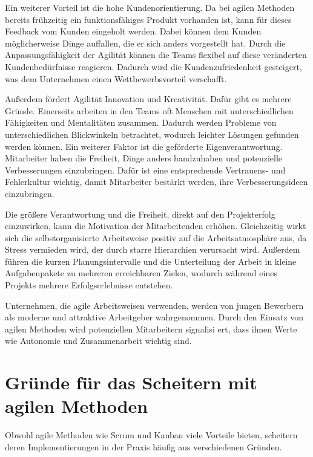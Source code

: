 \documentclass[ngerman]{seminarvorlage}
\begin{document}
Ein weiterer Vorteil ist die hohe Kundenorientierung. Da bei agilen Methoden bereits frühzeitig ein funktionsfähiges Produkt vorhanden ist, kann für dieses Feedback vom Kunden eingeholt werden. Dabei können dem Kunden möglicherweise Dinge auffallen, die er sich anders vorgestellt hat. Durch die Anpassungsfähigkeit der Agilität können die Teams flexibel auf diese veränderten Kundenbedürfnisse reagieren. Dadurch wird die Kundenzufriedenheit gesteigert, was dem Unternehmen einen Wettbewerbsvorteil verschafft.\cite{Theobald.2021,facebook.2024}

Außerdem fördert Agilität Innovation und Kreativität. Dafür gibt es mehrere Gründe. Einerseits arbeiten in den Teams oft Menschen mit unterschiedlichen Fähigkeiten und Mentalitäten zusammen. Dadurch werden Probleme von unterschiedlichen Blickwinkeln betrachtet, wodurch leichter Lösungen gefunden werden können.  Ein weiterer Faktor ist die geförderte Eigenverantwortung. Mitarbeiter haben die Freiheit, Dinge anders handzuhaben und potenzielle Verbesserungen einzubringen. Dafür ist eine entsprechende Vertrauens- und Fehlerkultur wichtig, damit Mitarbeiter bestärkt werden, ihre Verbesserungsideen einzubringen. \cite{Theobald.2021}

Die größere Verantwortung und die Freiheit, direkt auf den Projekterfolg einzuwirken, kann die Motivation der Mitarbeitenden erhöhen. Gleichzeitig wirkt sich die selbstorganisierte Arbeitsweise positiv auf die Arbeitsatmosphäre aus, da Stress vermieden wird, der durch starre Hierarchien verursacht wird. Außerdem führen die kurzen Planungsintervalle und die Unterteilung der Arbeit in kleine Aufgabenpakete zu mehreren erreichbaren Zielen, wodurch während eines Projekts mehrere Erfolgserlebnisse entstehen.\cite{Theobald.2021}

Unternehmen, die agile Arbeitsweisen verwenden, werden von jungen Bewerbern als moderne und attraktive Arbeitgeber wahrgenommen. Durch den Einsatz von agilen Methoden wird potenziellen Mitarbeitern signalisi
ert, dass ihnen Werte wie Autonomie und Zusammenarbeit wichtig sind.\cite{personio.2024}

\newpage
\section{Gründe für das Scheitern mit agilen Methoden}

Obwohl agile Methoden wie Scrum und Kanban viele Vorteile bieten, scheitern deren Implementierungen in der Praxis häufig aus verschiedenen Gründen. \\
\end{document}
